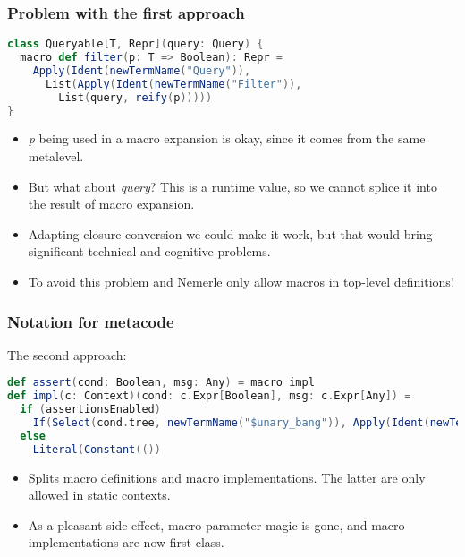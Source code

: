 \documentclass[hyperref={bookmarks=false}]{beamer}
\begin{document}
\begin{frame}[fragile]
\frametitle{Problem with the first approach}
\begin{lstlisting}[language=scala]
class Queryable[T, Repr](query: Query) {
  macro def filter(p: T => Boolean): Repr =
    Apply(Ident(newTermName("Query")),
      List(Apply(Ident(newTermName("Filter")),
        List(query, reify(p)))))
}
\end{lstlisting}

\begin{itemize}
\item \emph{p} being used in a macro expansion is okay, since it comes from the same metalevel.
\item But what about \emph{query}? This is a runtime value, so we cannot splice it into the result of macro expansion.
\item Adapting closure conversion we could make it work, but that would bring significant technical and cognitive problems.
\item To avoid this problem \text{\color{red}{Template Haskell}} and Nemerle only allow macros in top-level definitions!
\end{itemize}
\end{frame}

\begin{frame}[fragile]
\frametitle{Notation for metacode}

The second approach:
\begin{lstlisting}[language=scala]
def assert(cond: Boolean, msg: Any) = macro impl
def impl(c: Context)(cond: c.Expr[Boolean], msg: c.Expr[Any]) =
  if (assertionsEnabled)
    If(Select(cond.tree, newTermName("$unary_bang")), Apply(Ident(newTermName("raise")), List(msg.tree)), Literal(Constant(())))
  else
    Literal(Constant(())
\end{lstlisting}

\begin{itemize}
\item Splits macro definitions and macro implementations. The latter are only allowed in static contexts.
\item As a pleasant side effect, macro parameter magic is gone, and macro implementations are now first-class.
\end{itemize}
\end{frame}
\end{document}
